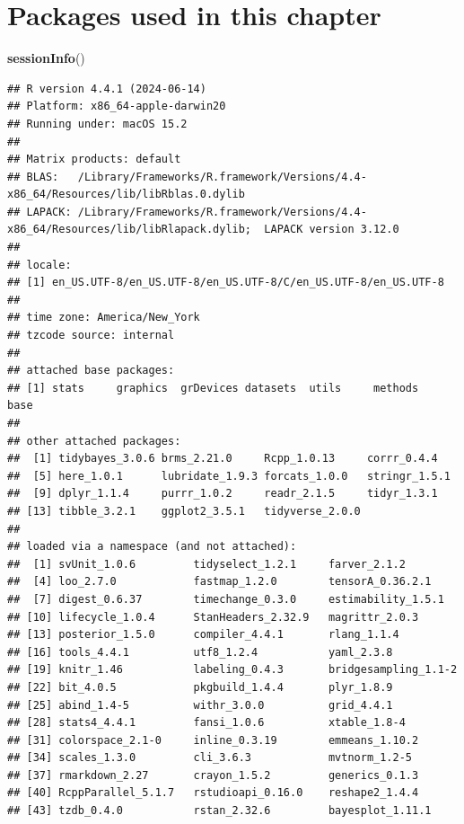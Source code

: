 \documentclass[
]{book}
\newenvironment{Shaded}{\begin{snugshade}}{\end{snugshade}}
\newcommand{\FunctionTok}[1]{\textcolor[rgb]{0.13,0.29,0.53}{\textbf{#1}}}
\newcommand{\NormalTok}[1]{#1}
\begin{document}
\section{Packages used in this chapter}\label{packages-used-in-this-chapter-3}

\begin{Shaded}
\begin{Highlighting}[]
\FunctionTok{sessionInfo}\NormalTok{()}
\end{Highlighting}
\end{Shaded}

\begin{verbatim}
## R version 4.4.1 (2024-06-14)
## Platform: x86_64-apple-darwin20
## Running under: macOS 15.2
## 
## Matrix products: default
## BLAS:   /Library/Frameworks/R.framework/Versions/4.4-x86_64/Resources/lib/libRblas.0.dylib 
## LAPACK: /Library/Frameworks/R.framework/Versions/4.4-x86_64/Resources/lib/libRlapack.dylib;  LAPACK version 3.12.0
## 
## locale:
## [1] en_US.UTF-8/en_US.UTF-8/en_US.UTF-8/C/en_US.UTF-8/en_US.UTF-8
## 
## time zone: America/New_York
## tzcode source: internal
## 
## attached base packages:
## [1] stats     graphics  grDevices datasets  utils     methods   base     
## 
## other attached packages:
##  [1] tidybayes_3.0.6 brms_2.21.0     Rcpp_1.0.13     corrr_0.4.4    
##  [5] here_1.0.1      lubridate_1.9.3 forcats_1.0.0   stringr_1.5.1  
##  [9] dplyr_1.1.4     purrr_1.0.2     readr_2.1.5     tidyr_1.3.1    
## [13] tibble_3.2.1    ggplot2_3.5.1   tidyverse_2.0.0
## 
## loaded via a namespace (and not attached):
##  [1] svUnit_1.0.6         tidyselect_1.2.1     farver_2.1.2        
##  [4] loo_2.7.0            fastmap_1.2.0        tensorA_0.36.2.1    
##  [7] digest_0.6.37        timechange_0.3.0     estimability_1.5.1  
## [10] lifecycle_1.0.4      StanHeaders_2.32.9   magrittr_2.0.3      
## [13] posterior_1.5.0      compiler_4.4.1       rlang_1.1.4         
## [16] tools_4.4.1          utf8_1.2.4           yaml_2.3.8          
## [19] knitr_1.46           labeling_0.4.3       bridgesampling_1.1-2
## [22] bit_4.0.5            pkgbuild_1.4.4       plyr_1.8.9          
## [25] abind_1.4-5          withr_3.0.0          grid_4.4.1          
## [28] stats4_4.4.1         fansi_1.0.6          xtable_1.8-4        
## [31] colorspace_2.1-0     inline_0.3.19        emmeans_1.10.2      
## [34] scales_1.3.0         cli_3.6.3            mvtnorm_1.2-5       
## [37] rmarkdown_2.27       crayon_1.5.2         generics_0.1.3      
## [40] RcppParallel_5.1.7   rstudioapi_0.16.0    reshape2_1.4.4      
## [43] tzdb_0.4.0           rstan_2.32.6         bayesplot_1.11.1    

\end{verbatim}
\end{document}
